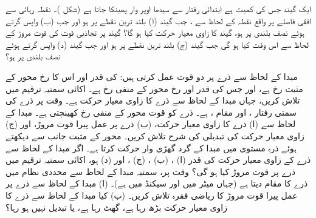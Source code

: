 ایک گیند جس کی کمیت  ہے   ابتدائی رفتار  سے سیدھا اوپر وار  پھینکا جاتا ہے (شکل )۔  نقطہ رہائی سے   افقی فاصلے پر واقع نقطہ  کے لحاظ سے ، جب گیند  (ا) بلند ترین نقطے پر ہو اور  جب (ب) واپس  گرتے ہوئے نصف بلندی پر ہو، گیند کا زاوی معیار حرکت کیا ہو گا؟ گیند پر تجاذبی قوت کی قوت مروڑ  کے لحاظ سے اس وقت کیا ہو گی جب گیند  (ج) بلند ترین نقطے پر ہو اور جب گیند (د)  واپس گرتے ہوئے نصف بلندی پر ہو؟

مبدا کے لحاظ سے   ذرے پر دو قوت عمل کرتی ہیں:  کی قدر  اور اس کا رخ محور  کے مثبت رخ ہے، اور  جس کی قدر  اور رخ محور  کے منفی رخ ہے۔ اکائی سمتیہ ترقیم میں   تلاش کریں، جہاں  مبدا کے لحاظ سے ذرے کا زاوی معیار حرکت  ہے۔
وقت  پر   ذرے  کی سمتی رفتار  ، اور مقام  ،  ہے۔  ذرے کو  قوت  محور  کے منفی رخ کھینچتی ہے۔ مبدا کے لحاظ سے (ا)  ذرے کا زاوی معیار حرکت، (ب)  ذرے پر عمل پیرا قوت مروڑ، اور (ج)  زاوی معیار حرکت  کی تبدیلی کی شرح تلاش کریں۔
محور  کے مثبت جانب سے دیکھتے ہوئے  ذرہ  مستوی  میں  مبدا کے گرد گھڑی وار حرکت کرتا ہے۔ اگر مبدا کے لحاظ سے  ذرے کے  زاوی  معیار حرکت  کی قدر (ا)  ، (ب) ، (ج)  ، اور (د)   ہو،  اکائی سمتیہ ترقیم میں  ذرے پر قوت مروڑ کیا ہو گی؟
وقت  پر، سمتیہ   مبدا کے لحاظ سے   محددی نظام میں   ذرے کا   مقام دیتا ہے (جہاں   میٹر میں اور  سیکنڈ میں ہے)۔ (ا)  مبدا کے لحاظ سے ذرے پر عمل پیرا قوت مروڑ کا ریاضی فقرہ تلاش کریں۔ (ب)  کیا مبدا کے لحاظ سے ذرے کا زاوی معیار حرکت  بڑھ رہا ہے، گھٹ رہا ہے، یا تبدیل نہیں ہو رہا؟

